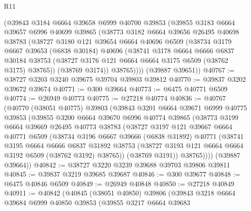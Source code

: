 \begin{lexlean}{R11}
\begin{coremodule}
      (@39843
        @3184
        @6664
        @39658
        @6999
        @40700
        @39853
        (@39855
          @3183
          @6664
          @39657
          @6996
          @40699
          @39865
          (@38773
            @3182
            @6664
            @39656
            @26495
            @40698
            @38783
            (@38727
              @3180
              @121
              @39654
              @6664
              @40696
              @6509
              (@38734
                @3179
                @6667
                @39653
                (@6838 @30184)
                @40696
                (@38741
                  @3178
                  @6664
                  @6666
                  @6837
                  @30184
                  @38753
                  (@38727 @3176 @121 @6664 @6664 @3175 @6509 (@38762 @3175) @38765))
                (@38769 @3174))
              @38765))))
      (@39887 @39651))
@40767 := @38727 @3203 @3240 @39675 @39704 @39803 @39812
@40770 := @39837 @3202 @39672 @39674
@40771 := @300 @39664
@40773 := @6475 @40771 @6509
@40774 := @26949 @40773
@40775 := @27218 @40774
@40836 := @40767
    (@40770
      (@38051 @40775)
      @39803
      (@39843
        @3201
        @6664
        @39671
        @6999
        @40775
        @39853
        (@39855
          @3200
          @6664
          @39670
          @6996
          @40774
          @39865
          (@38773
            @3199
            @6664
            @39669
            @26495
            @40773
            @38783
            (@38727
              @3197
              @121
              @39667
              @6664
              @40771
              @6509
              (@38734
                @3196
                @6667
                @39666
                (@6838 @31892)
                @40771
                (@38741
                  @3195
                  @6664
                  @6666
                  @6837
                  @31892
                  @38753
                  (@38727 @3193 @121 @6664 @6664 @3192 @6509 (@38762 @3192) @38765))
                (@38769 @3191))
              @38765))))
      (@39887 @39664))
@40842 := @38727 @3220 @3239 @39688 @39703 @39806 @39811
@40845 := @39837 @3219 @39685 @39687
@40846 := @300 @39677
@40848 := @6475 @40846 @6509
@40849 := @26949 @40848
@40850 := @27218 @40849
@40911 := @40842
    (@40845
      (@38051 @40850)
      @39806
      (@39843
        @3218
        @6664
        @39684
        @6999
        @40850
        @39853
        (@39855
          @3217
          @6664
          @39683

\end{coremodule}
\end{lexlean}
